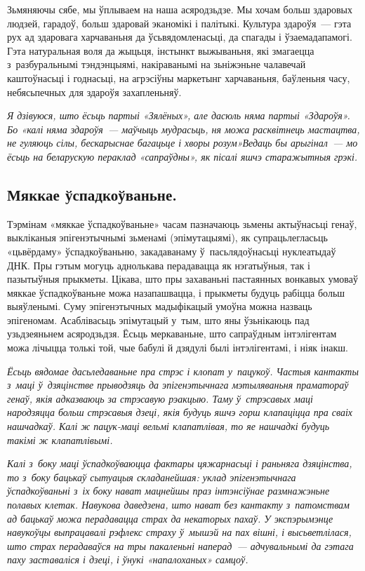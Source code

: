 Зьмяняючы сябе, мы ўплываем на наша асяродзьдзе. Мы хочам больш здаровых людзей, гарадоў, больш здаровай эканомікі і палітыкі. Культура здароўя~--- гэта рух ад здаровага харчаваньня да ўсьвядомленасьці, да спагады і ўзаемадапамогі. Гэта натуральная воля да жыцьця, інстынкт выжываньня, які змагаецца з~разбуральнымі тэндэнцыямі, накіраванымі на зьніжэньне чалавечай каштоўнасьці і годнасьці, на агрэсіўны маркетынг харчаваньня, баўленьня часу, небясьпечных для здароўя захапленьняў.

\emph{Я дзівуюся, што ёсьць партыі «Зялёных», але дасюль няма партыі «Здароўя». Бо «калі няма здароўя~--- маўчыць мудрасьць, ня можа расквітнець мастацтва, не гуляюць сілы, бескарыснае багацьце і хворы розум»Ведаць бы арыгінал~--- мо ёсьць на беларускую пераклад «сапраўдны», як пісалі яшчэ старажытныя грэкі.}

\subsection*{Мяккае ўспадкоўваньне.}

Тэрмінам «мяккае ўспадкоўваньне» часам пазначаюць зьмены актыўнасьці генаў, выкліканыя эпігенэтычнымі зьменамі (эпімутацыямі), як супрацьлегласьць «цьвёрдаму» ўспадкоўваньню, закадаванаму ў~пасьлядоўнасьці нуклеатыдаў ДНК. Пры гэтым могуць аднолькава перадавацца як нэгатыўныя, так і пазытыўныя прыкметы. Цікава, што пры захаваньні пастаянных вонкавых умоваў мяккае ўспадкоўваньне можа назапашвацца, і прыкметы будуць рабіцца больш выяўленымі. Суму эпігенэтычных мадыфікацый умоўна можна назваць эпігеномам. Асаблівасьць эпімутацый у~тым, што яны ўзьнікаюць пад узьдзеяньнем асяродзьдзя. Ёсьць меркаваньне, што сапраўдным інтэлігентам можа лічыцца толькі той, чые бабулі й дзядулі былі інтэлігентамі, і ніяк інакш.

\emph{Ёсьць вядомае дасьледаваньне пра стрэс і клопат у~пацукоў. Частыя кантакты з~маці ў~дзяцінстве прыводзяць да эпігенэтычнага мэтыляваньня праматораў генаў, якія адказваюць за стрэсавую рэакцыю. Таму ў~стрэсавых маці народзяцца больш стрэсавыя дзеці, якія будуць яшчэ горш клапаціцца пра сваіх нашчадкаў. Калі ж пацук-маці вельмі клапатлівая, то яе нашчадкі будуць такімі ж клапатлівымі.}

\emph{Калі з~боку маці ўспадкоўваюцца фактары цяжарнасьці і раньняга дзяцінства, то з~боку бацькаў сытуацыя складанейшая: уклад эпігенэтычнага ўспадкоўваньні з~іх боку нават мацнейшы праз інтэнсіўнае размнажэньне полавых клетак. Навукова даведзена, што нават без кантакту з~патомствам ад бацькаў можа перадавацца страх да некаторых пахаў. У экспэрымэнце навукоўцы выпрацавалі рэфлекс страху ў~мышэй на пах вішні, і высьветлілася, што страх перадаваўся на тры пакаленьні наперад~--- адчувальнымі да гэтага паху заставаліся і дзеці, і ўнукі «напалоханых» самцоў.}


